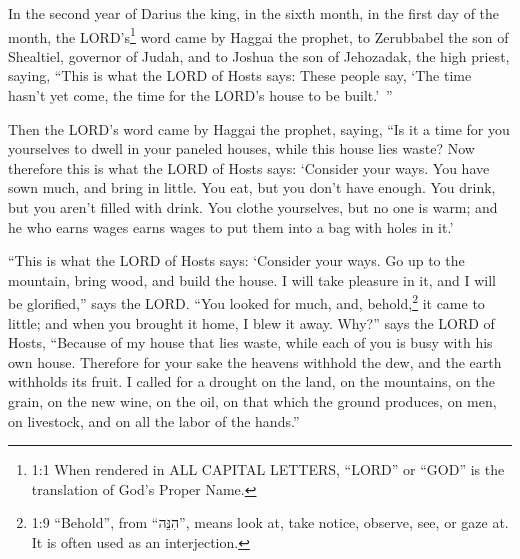 



\vspace{-1.36in}


\mychapter{} \myverse*{}In the second year of Darius the king, in the sixth month, in the first day of the month, the LORD’s\footnote{1:1 When rendered in ALL CAPITAL LETTERS, “LORD” or “GOD” is the translation of God’s Proper Name.} word came by Haggai the prophet, to Zerubbabel the son of Shealtiel, governor of Judah, and to Joshua the son of Jehozadak, the high priest, saying, \myverse{}“This is what the LORD of Hosts says: These people say, ‘The time hasn’t yet come, the time for the LORD’s house to be built.’ ”


\myverse{}Then the LORD’s word came by Haggai the prophet, saying, \myverse{}“Is it a time for you yourselves to dwell in your paneled houses, while this
house lies waste? \myverse{}Now therefore this is what the LORD of Hosts says: ‘Consider your ways. \myverse{}You have sown much, and bring in little. You eat, but you don’t have enough. You drink, but you aren’t filled with drink. You clothe yourselves, but no one is warm; and he who earns wages earns wages to put them into a bag with holes in it.’


\myverse{}“This is what the LORD of Hosts says: ‘Consider your ways. \myverse{}Go up to the mountain, bring wood, and build the house. I will take pleasure in it, and I will be glorified,” says the LORD. \myverse{}“You looked for much, and, behold,\footnote{1:9 “Behold”, from “הִנֵּה”, means look at, take notice, observe, see, or gaze at. It is often used as an interjection.} it came to little; and when you brought it home, I blew it away. Why?” says the LORD of Hosts, “Because of my house that lies waste, while each of you is busy with his own house. \myverse{}Therefore for your sake the heavens withhold the dew, and the earth withholds its fruit. \myverse{}I called for a drought on the land, on the mountains, on the grain, on the new wine, on the oil, on that which the ground produces, on men, on livestock, and on all the labor of the hands.”


